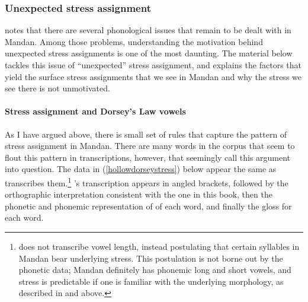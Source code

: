 \subsubsection{Unexpected stress assignment}\label{unexpectedstress}

\citet[35]{hollow1970} notes that there are several phonological issues that remain to be dealt with in Mandan. Among those problems, understanding the motivation behind unexpected stress assignments is one of the most daunting. The material below tackles this issue of ``unexpected'' stress assignment, and explains the factors that yield the surface stress assignments that we see in Mandan and why the stress we see there is not unmotivated.

\paragraph{Stress assignment and Dorsey's Law vowels}\label{secdorseystress}

\noindent As I have argued above, there is small set of rules that capture the pattern of stress assignment in Mandan. There are many words in the corpus that seem to flout this pattern in  transcriptions, however, that seemingly call this argument into question. The data in (\ref{hollowdorseystress}) below appear the same as \citeauthor{hollow1970} transcribes them.\footnote{\citet{hollow1970} does not transcribe vowel length, instead postulating that certain syllables in Mandan bear underlying stress. This postulation is not borne out by the phonetic data; Mandan definitely has phonemic long and short vowels, and stress is predictable if one is familiar with the underlying morphology, as described in  and  above.} \citeauthor{hollow1970}'s transcription appears in angled brackets, followed by the orthographic interpretation consistent with the one in this book, then the phonetic and phonemic representation of of each word, and finally the gloss for each word.

